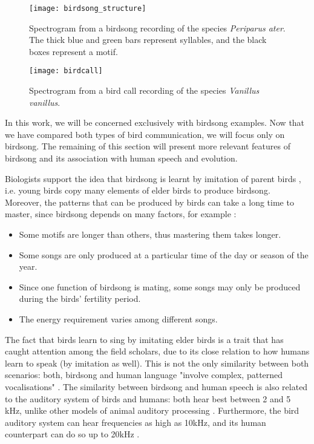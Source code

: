 \documentclass[../main.tex]{subfiles}
\begin{document}
\begin{figure}[t]
\texttt{[image: birdsong\_structure]}
\caption{Spectrogram from a birdsong recording of the species \emph{Periparus ater}. The thick blue and green bars represent syllables, and the black boxes represent a motif.}
\label{fig_birdsong_structure}
\end{figure}

\begin{figure}[t]
\texttt{[image: birdcall]}
\caption{Spectrogram from a bird call recording of the species \emph{Vanillus vanillus}.}
\label{fig_birdcall}
\end{figure}

\par In this work, we will be concerned exclusively with birdsong examples. Now that we have compared both types of bird communication, we will focus only on birdsong. The remaining of this section will present more relevant features of birdsong and its association with human speech and evolution.
\par Biologists support the idea that birdsong is learnt by imitation of parent birds \cite{Berwick2013}, i.e. young birds copy many elements of elder birds to produce birdsong. Moreover, the patterns that can be produced by birds can take a long time to master, since birdsong depends on many factors, for example \cite{Naguib2014}: 
\begin{itemize}
\item Some motifs are longer than others, thus mastering them takes longer.
\item Some songs are only produced at a particular time of the day or season of the year.
\item Since one function of birdsong is mating, some songs may only be produced during the birds' fertility period.
\item The energy requirement varies among different songs.
\end{itemize}
\par The fact that birds learn to sing by imitating elder birds is a trait that has caught attention among the field scholars, due to its close relation to how humans learn to speak (by imitation as well). This is not the only similarity between both scenarios: both, birdsong and human language "involve complex, patterned vocalisations" \cite{Berwick2013} \cite{Naguib2014}. The similarity between birdsong and human speech is also related to the auditory system of birds and humans: both hear best between 2 and 5 kHz, unlike other models of animal auditory processing \cite{Snowdon2013}. Furthermore, the bird auditory system can hear frequencies as high as 10kHz, and its human counterpart can do so up to 20kHz \cite{Snowdon2013}.
\end{document}
